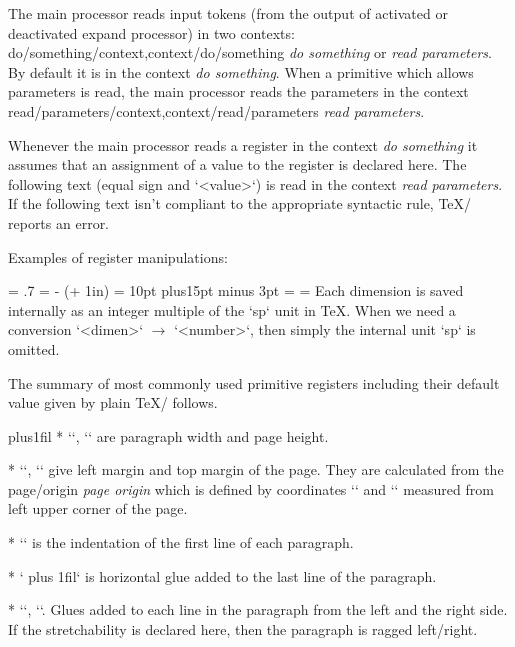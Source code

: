 {\removelastskip
The main processor reads input tokens (from the output of activated or
deactivated expand processor) in two contexts: 
\ii do/something/context,context/do/something {\em do something} or {\em
read parameters}. By default it is in the context {\em do something}. When a
primitive which allows parameters is read, the main processor reads the
parameters in the context \ii read/parameters/context,context/read/parameters {\em read parameters}.

Whenever the main processor reads a register in the context
{\em do something} it assumes that an assignment of a value to the register
is declared here. The following text (equal sign and `<value>`) is read in the context
{\em read parameters}. If the following text isn't
compliant to the appropriate syntactic rule, \TeX/ reports an error.

Examples of register manipulations:

\begtt
\newcount\mynumber \newdimen\mydimen \newdimen\myskip
\hsize = .7\hsize  %
\hoffset = \dimexpr 10mm - (\parindent + 1in) \relax %
\myskip = 10pt plus15pt minus 3pt
\mydimen = \myskip    %
\mynumber = \mydimen  %
\endtt
%
Each dimension is saved internally as an integer multiple of the `sp` unit in
\TeX. When we need a conversion `<dimen>` $\to$ `<number>`, then simply the
internal unit `sp` is omitted.

The summary of most commonly used primitive registers including their default
value given by plain \TeX/ follows.

\let\makedest=\makedestactive

\begitems  \rightskip=0pt plus1fil
* \y`\hsize=6.5in`,
  \y`\vsize=8.9in`
  are paragraph width and page height.

* \y`\hoffset=0pt`,
  \y`\voffset=0pt` give left margin and top margin of the page. They are
  calculated from the \ii page/origin {\em page origin} which is defined by coordinates
  \y`\pdfvorigin=1in` and \y`\pdfhorigin=1in` measured from left upper corner of
  the page.

* \y`\parindent=20pt` is the indentation of the first line of each paragraph.

* \y`\parfillskip=0pt plus 1fil` is horizontal glue added to the last line of the
  paragraph.

* \y`\leftskip=0pt`, \y`\rightskip=0pt`. Glues added to each line in the
  paragraph from the left and the right side. If the stretchability is declared here,
  then the paragraph is ragged left/right.

}
